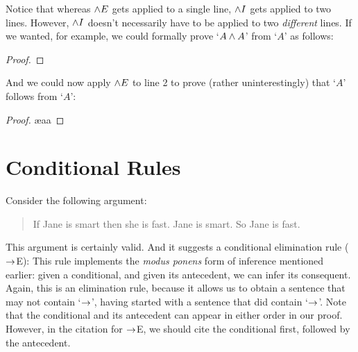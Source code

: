Notice that whereas $\wedge E$ gets applied to a single line, $\wedge I$ gets applied to two lines.  However, $\wedge I$ doesn't necessarily have to be applied to two \emph{different} lines.   If we wanted, for example, we could formally prove `$A \wedge A$' from `$A$' as follows:
\begin{proof}
\end{proof}
And we could now apply $\wedge E$ to line 2 to prove (rather uninterestingly) that `$A$' follows from `$A$':

\begin{proof}
	\ae{aa}
\end{proof}

\section{Conditional Rules}
Consider the following argument:
	\begin{quote}
		If Jane is smart then she is fast. Jane is smart. So Jane is fast.
	\end{quote}
This argument is certainly valid. And it suggests a conditional elimination rule ($\rightarrow$E):
This rule implements the \emph{modus ponens} form of inference mentioned earlier: given a conditional, and given its antecedent, we can infer its consequent. Again, this is an elimination rule, because it allows us to obtain a sentence that may not contain `$\rightarrow$', having started with a sentence that did contain `$\rightarrow$'. Note that the conditional and its antecedent can appear in either order in our proof. However, in the citation for $\rightarrow$E, we should  cite the conditional first, followed by the antecedent.


